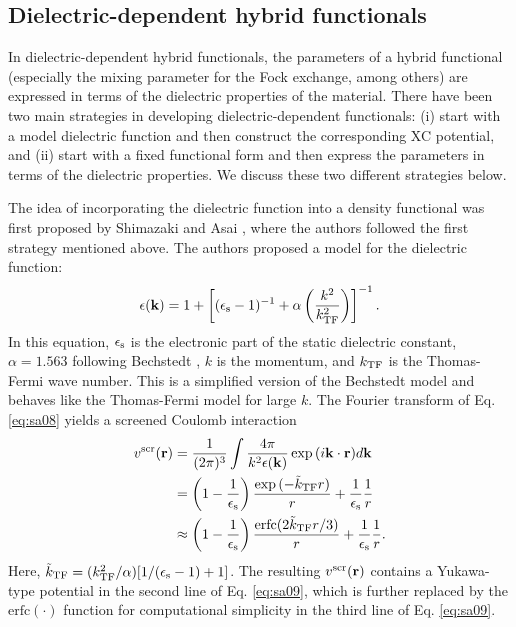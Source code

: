 \documentclass[aip, amsmath, amssymb, reprint, longbibliography]{revtex4-2}
\def\mr{\mathbf{r}}
\begin{document}
\subsection{Dielectric-dependent hybrid functionals}
\label{sec:dielec}

In dielectric-dependent hybrid functionals, the parameters of a hybrid functional (especially the mixing parameter for the Fock exchange, among others) are expressed in terms of the dielectric properties of the material. There have been two main strategies in developing dielectric-dependent functionals: (i) start with a model dielectric function and then construct the corresponding XC potential, and (ii) start with a fixed functional form and then express the parameters in terms of the dielectric properties. We discuss these two different strategies below.

The idea of incorporating the dielectric function into a density functional was first proposed by Shimazaki and Asai \cite{SA08}, where the authors followed the first strategy mentioned above. The authors proposed a model for the dielectric function:
\begin{equation}
\epsilon(\mathbf{k})=1+\left[(\epsilon_{\rm s}-1)^{-1}+\alpha\left(\frac{k^2}{k^2_{\rm TF}}\right)\right]^{-1}.
\label{eq:sa08}
\end{equation}
In this equation, $\epsilon_{\rm s}$ is the electronic part of the static dielectric constant, $\alpha=1.563$ following Bechstedt \cite{BSCR92,CDLB93}, $k$ is the momentum, and $k_{\rm TF}$ is the Thomas-Fermi wave number. This is a simplified version of the Bechstedt model and behaves like the Thomas-Fermi model for large $k$. The Fourier transform of Eq. \eqref{eq:sa08} yields a screened Coulomb interaction
\begin{equation}
\begin{split}
v^{\rm scr}(\mr)& =\frac{1}{(2\pi)^3}\int \frac{4\pi}{k^2\epsilon(\mathbf{k})}\exp{(i\mathbf{k}\cdot\mr)}d\mathbf{k} \\
& = \left(1-\frac{1}{\epsilon_{\rm s}}\right)\frac{\exp{(-\tilde{k}_{\rm TF}r)}}{r}+\frac{1}{\epsilon_{\rm s}}\frac{1}{r} \\
& \approx \left(1-\frac{1}{\epsilon_{\rm s}}\right)\frac{\mbox{erfc}(2\tilde{k}_{\rm TF}r/3)}{r}+\frac{1}{\epsilon_{\rm s}}\frac{1}{r}.
\end{split}
\label{eq:sa09}
\end{equation}
Here, $\tilde{k}_{\rm TF}=(k^2_{\rm TF}/\alpha)[1/(\epsilon_{\rm s}-1)+1]$. The resulting $v^{\rm scr}(\mr)$ contains a Yukawa-type potential in the second line of Eq. \eqref{eq:sa09}, which is further replaced by the $\mbox{erfc}(\cdot)$ function for computational simplicity in the third line of Eq. \eqref{eq:sa09}.
\end{document}
